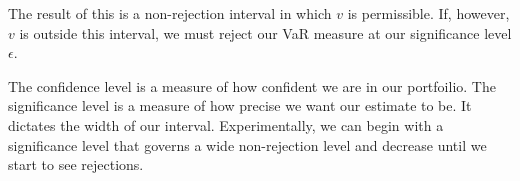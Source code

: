 \documentclass[../Dissertation.tex]{subfiles}
\begin{document}
The result of this is a non-rejection interval in which $v$ is permissible.
If, however, $v$ is outside this interval, we must reject our VaR measure at our significance level $\epsilon$.

The confidence level is a measure of how confident we are in our portfoilio.
The significance level is a measure of how precise we want our estimate to be.
It dictates the width of our interval.
Experimentally, we can begin with a significance level that governs a wide non-rejection level and decrease until we start to see rejections.
\end{document}
